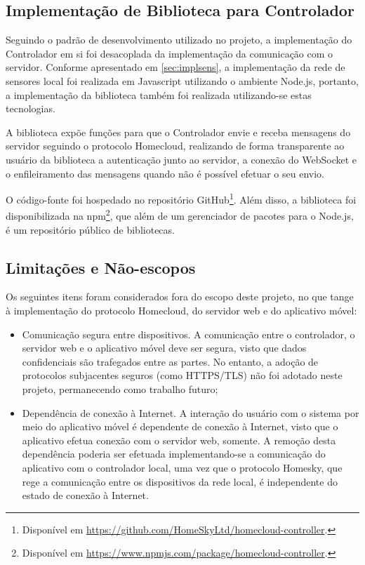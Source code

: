 \subsection{Implementação de Biblioteca para Controlador}
Seguindo o padrão de desenvolvimento utilizado no projeto, a implementação
do Controlador em si foi desacoplada da implementação da comunicação
com o servidor. Conforme apresentado em \ref{sec:implsens}, a implementação
da rede de sensores local foi realizada em Javascript utilizando o
ambiente Node.js, portanto, a implementação da biblioteca também foi
realizada utilizando-se estas tecnologias.

A biblioteca expõe funções para que o Controlador envie e receba mensagens do servidor seguindo o protocolo Homecloud, realizando de forma transparente ao usuário da biblioteca a autenticação junto ao servidor, a conexão do WebSocket e o enfileiramento das mensagens quando não é possível efetuar o seu envio.

O código-fonte foi hospedado no repositório GitHub\footnote{Disponível em \url{https://github.com/HomeSkyLtd/homecloud-controller}.}. Além disso, a 
biblioteca foi disponibilizada na npm\footnote{Disponível em \url{https://www.npmjs.com/package/homecloud-controller}.}, que além de um gerenciador de pacotes para o Node.js, é um repositório público de bibliotecas.

\subsection{Limitações e Não-escopos} \label{subsec:limit_serv_app}
Os seguintes itens foram considerados fora do escopo deste projeto, no que tange à implementação do protocolo Homecloud, do servidor web e do aplicativo móvel:

\begin{itemize}
	\item Comunicação segura entre dispositivos. A comunicação entre o controlador, o servidor web e o aplicativo móvel deve ser segura, visto que dados confidenciais são trafegados entre as partes. No entanto, a adoção de protocolos subjacentes seguros (como HTTPS/TLS) não foi adotado neste projeto, permanecendo como trabalho futuro;
	\item Dependência de conexão à Internet. A interação do usuário com o sistema por meio do aplicativo móvel é dependente de conexão à Internet, visto que o aplicativo efetua conexão com o servidor web, somente. A remoção desta dependência poderia ser efetuada implementando-se a comunicação do aplicativo com o controlador local, uma vez que o protocolo Homesky, que rege a comunicação entre os dispositivos da rede local, é independente do estado de conexão à Internet.
\end{itemize}


